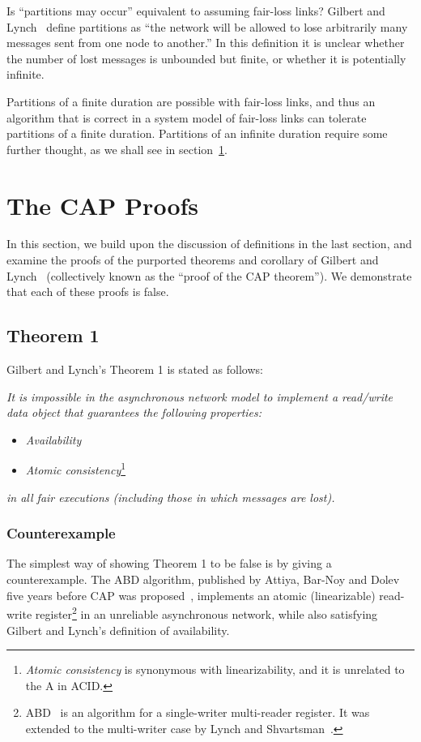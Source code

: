 \documentclass[a4paper,twocolumn,10pt]{article}
\begin{document}
Is ``partitions may occur'' equivalent to assuming fair-loss links? Gilbert and
Lynch~\cite{Gilbert2002il} define partitions as ``the network will be allowed to lose arbitrarily
many messages sent from one node to another.'' In this definition it is unclear whether the number
of lost messages is unbounded but finite, or whether it is potentially infinite.

Partitions of a finite duration are possible with fair-loss links, and thus an algorithm that is
correct in a system model of fair-loss links can tolerate partitions of a finite duration.
Partitions of an infinite duration require some further thought, as we shall see in
section~\ref{sec:proofs}.

\section{The CAP Proofs}\label{sec:proofs}

In this section, we build upon the discussion of definitions in the last section, and examine the
proofs of the purported theorems and corollary of Gilbert and Lynch~\cite{Gilbert2002il}
(collectively known as the ``proof of the CAP theorem''). We demonstrate that each of these proofs
is false.

\subsection{Theorem 1}\label{sec:theorem1}

Gilbert and Lynch's Theorem 1 is stated as follows:

\emph{It is impossible in the asynchronous network model to implement a read/write data object that
guarantees the following properties:}
\begin{itemize}
\item \emph{Availability}
\item \emph{Atomic consistency}\footnote{\emph{Atomic consistency} is synonymous with linearizability, and
it is unrelated to the A in ACID.}
\end{itemize}
\emph{in all fair executions (including those in which messages are lost).}

\subsubsection{Counterexample}\label{sec:abd-algorithm}

The simplest way of showing Theorem 1 to be false is by giving a counterexample. The ABD algorithm,
published by Attiya, Bar-Noy and Dolev five years before CAP was proposed~\cite{Attiya1995bm},
implements an atomic (linearizable) read-write register\footnote{ABD~\cite{Attiya1995bm} is an
algorithm for a single-writer multi-reader register. It was extended to the multi-writer case by
Lynch and Shvartsman~\cite{Lynch1997gr}.} in an unreliable asynchronous network, while also
satisfying Gilbert and Lynch's definition of availability.
\end{document}
